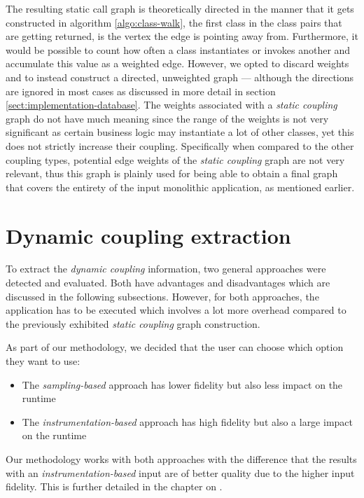 \documentclass[12pt,a4paper]{report}
\begin{document}
The resulting static call graph is theoretically directed in the manner that it
gets constructed in algorithm \ref{algo:class-walk}, the first class in the class
pairs that are getting returned, is the vertex the edge is pointing away from.
Furthermore, it would be possible to count how often a class instantiates or
invokes another and accumulate this value as a weighted edge.
However, we opted to discard weights and to instead construct a directed, unweighted graph ---
although the directions are ignored in most cases as discussed in more detail in
section \ref{sect:implementation-database}.
The weights associated with a \textit{static coupling} graph
do not have much meaning since the range of the weights is not very significant
as certain business logic may instantiate a lot of other classes,
yet this does not strictly increase their coupling.
Specifically when compared to the other coupling types, potential edge weights
of the \textit{static coupling} graph are not very relevant, thus this graph
is plainly used for being able to obtain a final graph that covers the
entirety of the input monolithic application, as mentioned earlier.



\section{Dynamic coupling extraction} \label{sect:dynamic-coupling-extraction}

To extract the \textit{dynamic coupling} information, two general approaches
were detected and evaluated. Both have advantages and disadvantages which
are discussed in the following subsections. However, for both approaches,
the application has to be executed which involves a lot more overhead compared
to the previously exhibited \textit{static coupling} graph construction.

As part of our methodology, we decided that the user can choose which option
they want to use:
\begin{itemize}[noitemsep]
  \item The \textit{sampling\hyp based} approach has lower fidelity but
        also less impact on the runtime
  \item The \textit{instrumentation\hyp based} approach has high fidelity but
        also a large impact on the runtime
\end{itemize}
Our methodology works with both approaches with the difference that the results
with an \textit{instrumentation\hyp based} input are of better quality due to the
higher input fidelity. This is further detailed in the chapter on
\textit{}.
\end{document}
